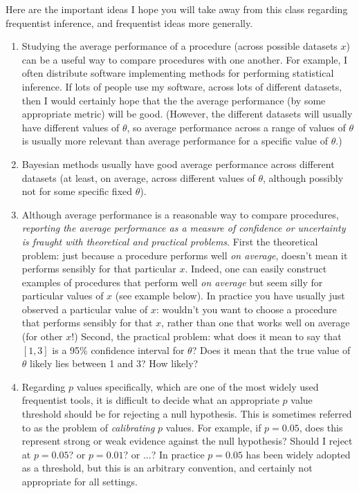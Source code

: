 \documentclass[times,11pt]{article}
\def\data{x}
\begin{document}
Here are the important ideas I hope you will take away from this class regarding frequentist inference, and frequentist ideas more generally. 
\begin{enumerate}
\item Studying the average performance of a procedure (across possible datasets $\data$) can be a useful way to compare procedures with one another. 
For example, I often distribute software implementing methods for performing statistical inference. If lots of people use my software, across lots of different datasets, then 
I would certainly hope that the the average performance (by some appropriate metric) will be good. 
(However, the different datasets will usually have different values of $\theta$, so
average performance across a range of values of $\theta$ is usually more relevant than average performance for a specific value of $\theta$.)
\item Bayesian methods usually have good average performance across different datasets (at least, on average, across different values of $\theta$, although possibly
not for some specific fixed $\theta$).
\item Although average performance is a reasonable way to compare procedures, 
{\it reporting the average performance as a measure of confidence or uncertainty is fraught with theoretical and practical problems}. 
First the theoretical problem: just because
a procedure performs well {\it on average}, doesn't mean it performs sensibly for that particular $\data$.  Indeed,  one can easily construct examples of procedures that perform well {\it on average}
but seem silly for particular values of $\data$ (see example below).
In practice
you have usually just observed a particular value of $\data$: wouldn't you want to choose a procedure that performs sensibly for that $\data$, rather than one that works well on average (for other $\data$!)
Second, the practical problem: what does it mean to say that $[1,3]$ is a 95\% confidence interval for $\theta$? Does it mean that the true value of $\theta$ likely
lies between 1 and 3? How likely? 
\item Regarding $p$ values specifically, which
are one of the most widely used frequentist tools,
it is difficult to decide what an appropriate $p$ value threshold should be for rejecting a null hypothesis. This is sometimes referred to as the problem of {\it calibrating} $p$ values. For example, if $p=0.05$, does this represent strong or weak evidence against the null hypothesis? Should I reject at $p=0.05$? or $p=0.01$? or ...?
In practice $p=0.05$ has been widely adopted as
a threshold, but this is an arbitrary convention, and certainly not appropriate for all settings.
\end{enumerate}
\end{document}
